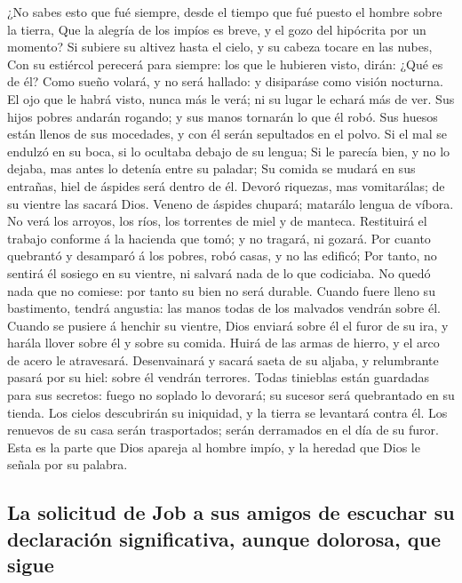  ¿No sabes esto que fué siempre, desde el tiempo que fué
puesto el hombre sobre la tierra,  Que la alegría de los
impíos es breve, y el gozo del hipócrita por un momento?  Si
subiere su altivez hasta el cielo, y su cabeza tocare en las nubes,
 Con su estiércol perecerá para siempre: los que le hubieren
visto, dirán: ¿Qué es de él?  Como sueño volará, y no será
hallado: y disiparáse como visión nocturna.  El ojo que le
habrá visto, nunca más le verá; ni su lugar le echará más de ver.
 Sus hijos pobres andarán rogando; y sus manos tornarán lo
que él robó.  Sus huesos están llenos de sus mocedades, y
con él serán sepultados en el polvo.  Si el mal se endulzó
en su boca, si lo ocultaba debajo de su lengua;  Si le
parecía bien, y no lo dejaba, mas antes lo detenía entre su paladar;
 Su comida se mudará en sus entrañas, hiel de áspides será
dentro de él.  Devoró riquezas, mas vomitarálas; de su
vientre las sacará Dios.  Veneno de áspides chupará;
matarálo lengua de víbora.  No verá los arroyos, los ríos,
los torrentes de miel y de manteca.  Restituirá el trabajo
conforme á la hacienda que tomó; y no tragará, ni gozará. 
Por cuanto quebrantó y desamparó á los pobres, robó casas, y no las
edificó;  Por tanto, no sentirá él sosiego en su vientre,
ni salvará nada de lo que codiciaba.  No quedó nada que no
comiese: por tanto su bien no será durable.  Cuando fuere
lleno su bastimento, tendrá angustia: las manos todas de los malvados
vendrán sobre él.  Cuando se pusiere á henchir su vientre,
Dios enviará sobre él el furor de su ira, y harála llover sobre él y
sobre su comida.  Huirá de las armas de hierro, y el arco
de acero le atravesará.  Desenvainará y sacará saeta de su
aljaba, y relumbrante pasará por su hiel: sobre él vendrán terrores.
 Todas tinieblas están guardadas para sus secretos: fuego
no soplado lo devorará; su sucesor será quebrantado en su tienda.
 Los cielos descubrirán su iniquidad, y la tierra se
levantará contra él.  Los renuevos de su casa serán
trasportados; serán derramados en el día de su furor.  Esta
es la parte que Dios apareja al hombre impío, y la heredad que Dios le
señala por su palabra.

\hypertarget{la-solicitud-de-job-a-sus-amigos-de-escuchar-su-declaraciuxf3n-significativa-aunque-dolorosa-que-sigue}{%
\subsection{La solicitud de Job a sus amigos de escuchar su declaración
significativa, aunque dolorosa, que
sigue}\label{la-solicitud-de-job-a-sus-amigos-de-escuchar-su-declaraciuxf3n-significativa-aunque-dolorosa-que-sigue}}

